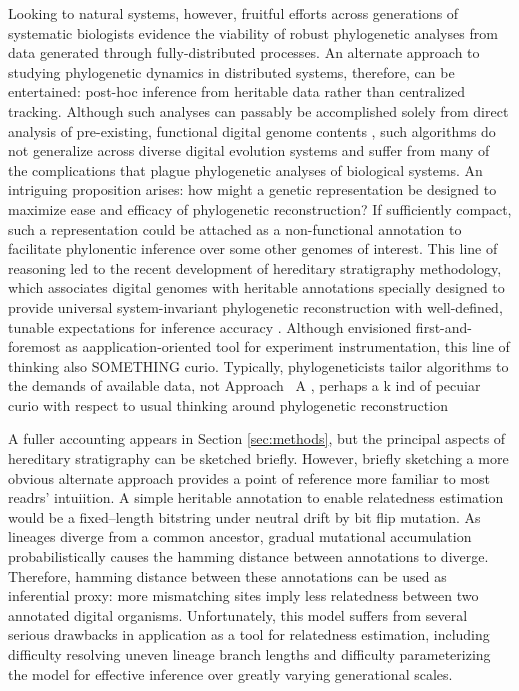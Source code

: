 Looking to  natural systems, however, fruitful efforts across generations of systematic biologists evidence the viability of robust phylogenetic analyses from data generated through fully-distributed processes.
An alternate approach to studying phylogenetic dynamics in distributed systems, therefore, can be entertained: post-hoc inference from heritable data rather than centralized tracking.
Although such analyses can passably be accomplished solely from direct analysis of pre-existing, functional digital genome contents \citep{moreno2021case}, such algorithms do not generalize across diverse digital evolution systems and suffer from many of the complications that plague phylogenetic analyses of biological systems.
An intriguing proposition arises: how might a genetic representation be designed to maximize ease and efficacy of phylogenetic reconstruction?
If sufficiently compact, such a representation could be attached as a non-functional annotation to facilitate phylonentic inference over some other genomes of interest.
This line of reasoning led to the recent development of hereditary stratigraphy methodology, which associates digital genomes with heritable annotations specially designed to provide universal system-invariant phylogenetic reconstruction with well-defined, tunable expectations for inference accuracy
\citep{moreno2022hereditary}.
Although envisioned first-and-foremost as aapplication-oriented tool for experiment instrumentation, this line of thinking also SOMETHING curio. 
Typically, phylogeneticists tailor algorithms to the demands of available data, not 
Approach  
\
A , perhaps a k
ind of pecuiar curio with respect to usual thinking around phylogenetic reconstruction


A fuller accounting appears in Section \ref{sec:methods}, but the principal aspects of hereditary stratigraphy can be sketched briefly.
However, briefly sketching a more obvious alternate approach provides a point of reference more familiar to most readrs' intuiition.
A simple heritable annotation to enable relatedness estimation would be a fixed--length bitstring under neutral drift by bit flip mutation.
As lineages diverge from a common ancestor, gradual mutational accumulation probabilistically causes the hamming distance between annotations to diverge.
Therefore, hamming distance between these annotations can be used as inferential proxy: more mismatching sites imply less relatedness between two annotated digital organisms.
Unfortunately, this model suffers from several serious drawbacks in application as a tool for relatedness estimation, including difficulty resolving uneven lineage branch lengths and difficulty parameterizing the model for effective inference over greatly varying generational scales.

